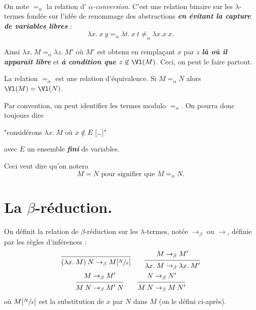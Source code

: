 \documentclass[./main]{subfiles}
\begin{document}
  \begin{rmk}
    ~\\[-1.5\baselineskip]

    On note $=_\alpha$ la relation d' \textit{$\alpha$-conversion}. C'est une relation binaire sur les $\lambda$-termes fondée sur l'idée de renommage des abstractions \textcolor{nicered}{\textit{\textbf{en évitant la capture de variables libres}}} :
    \[
    \lambda x. \: x \: y =_\alpha \lambda t.\: x \: t \neq_\alpha \lambda x. x \: x
    .\]

    Ainsi $\lambda x. \: M =_\alpha \lambda z.\: M'$ où  $M'$ est obtenu en remplaçant $x$ par $z$ \textcolor{nicered}{\textit{\textbf{là où il apparaît libre}}} et \textcolor{nicered}{\textit{\textbf{à condition que $z \not\in  \Vl(M)$}}}.
    Ceci, on peut le faire partout.
  \end{rmk}

  \begin{lem}
    La relation $=_\alpha$ est une relation d'équivalence.
    Si  $M =_\alpha N$ alors  $\Vl(M) = \Vl(N)$.
  \end{lem}

  Par convention, on peut identifier les termes modulo $=_\alpha$.
  On pourra donc toujours dire 
  \begin{center}
    "considérons $\lambda x.\: M$ où $x \not\in  E$ [\ldots]"
  \end{center}
  avec $E$ un ensemble \textit{\textbf{fini}} de variables.

  Ceci veut dire qu'on notera \[
  M = N \text{ pour signifier que } M =_\alpha N
  .\] 

  \section{La $\beta$-réduction.}

  \begin{defn}
    On définit la relation de $\beta$-réduction sur les  $\lambda$-termes, notée $\to_\beta$ ou $\to$, définie par les règles d'inférences :
    \begin{gather*}
      \begin{prooftree}
        \infer 0{(\lambda x.\: M)\: N \to_\beta M[\sfrac{N}{x}]}
      \end{prooftree}
      \quad\quad
      \begin{prooftree}
        \hypo{M \to_\beta M'}
        \infer 1{\lambda x.\: M \to_\beta \lambda x.\: M'}
      \end{prooftree}\\
      \begin{prooftree}
        \hypo{M \to_\beta M'}
        \infer 1{M \: N \to_\beta M' \: N}
      \end{prooftree}
      \quad\quad
      \begin{prooftree}
        \hypo{N \to_\beta N'}
        \infer 1{M \: N \to_\beta M \: N'}
      \end{prooftree}
    \end{gather*}
    où $M[\sfrac{N}{x}]$ est la substitution de $x$ par $N$ dans $M$ (on le défini ci-après).
  \end{defn}
\end{document}
